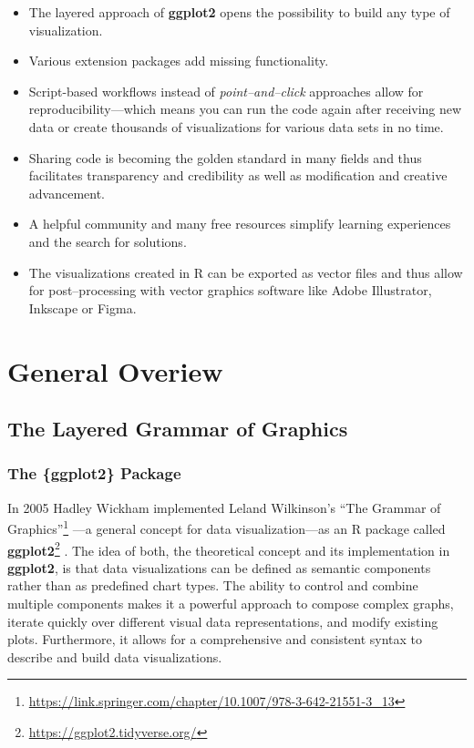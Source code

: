 \documentclass[
]{krantz}
\providecommand{\tightlist}{%
  \setlength{\itemsep}{0pt}\setlength{\parskip}{0pt}}
\renewcommand{\href}[2]{#2\footnote{\url{#1}}}
\begin{document}
\begin{itemize}
\tightlist
\item
  The layered approach of \textbf{ggplot2} opens the possibility to build any type of visualization.
\item
  Various extension packages add missing functionality.
\item
  Script-based workflows instead of \emph{point--and--click} approaches allow for reproducibility---which means you can run the code again after receiving new data or create thousands of visualizations for various data sets in no time.
\item
  Sharing code is becoming the golden standard in many fields and thus facilitates transparency and credibility as well as modification and creative advancement.
\item
  A helpful community and many free resources simplify learning experiences and the search for solutions.
\item
  The visualizations created in R can be exported as vector files and thus allow for post--processing with vector graphics software like Adobe Illustrator, Inkscape or Figma.
\end{itemize}

\hypertarget{part-general-overiew}{%
\part{General Overiew}\label{part-general-overiew}}

\hypertarget{grammar}{%
\chapter{The Layered Grammar of Graphics}\label{grammar}}

\hypertarget{ggplot}{%
\section{The \{ggplot2\} Package}\label{ggplot}}

In 2005 Hadley Wickham implemented Leland Wilkinson's \href{https://link.springer.com/chapter/10.1007/978-3-642-21551-3_13}{``The Grammar of Graphics''} \citep{wilkinson2005}---a general concept for data visualization---as an R package called \href{https://ggplot2.tidyverse.org/}{\textbf{ggplot2}} \citep{ggplot2}. The idea of both, the theoretical concept and its implementation in \textbf{ggplot2}, is that data visualizations can be defined as semantic components rather than as predefined chart types. The ability to control and combine multiple components makes it a powerful approach to compose complex graphs, iterate quickly over different visual data representations, and modify existing plots. Furthermore, it allows for a comprehensive and consistent syntax to describe and build data visualizations.
\end{document}
